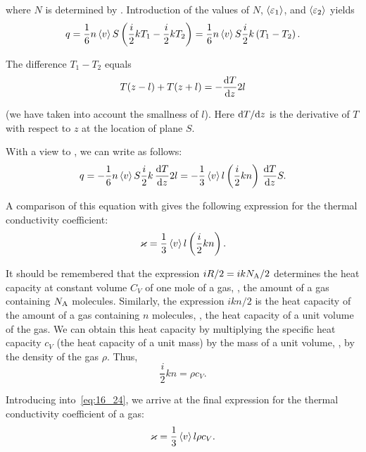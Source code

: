 \noindent
where $N$ is determined by . Introduction of the values of $N$, $\left\langle \varepsilon_1 \right\rangle$, and $\left\langle \varepsilon_2 \right\rangle$ yields
\begin{equation}\label{eq:16_21}
    q = \frac{1}{6} n\left\langle v \right\rangle S \left(\frac{i}{2}kT_1 - \frac{i}{2}kT_2\right) = \frac{1}{6} n\left\langle v \right\rangle S \frac{i}{2} k\left(T_1-T_2\right).
\end{equation}

\noindent
The difference $T_1-T_2$ equals
\begin{equation}\label{eq:16_22}
    T (z-l) + T (z+l) = -\frac{\mathrm{d} T}{\mathrm{d} z} 2l
\end{equation}

\noindent
(we have taken into account the smallness of $l$). Here $\mathrm{d} T/\mathrm{d} z$ is the derivative of $T$ with respect to $z$ at the location of plane $S$.

With a view to , we can write  as follows:
\begin{equation}\label{eq:16_23}
    q = -\frac{1}{6} n\left\langle v \right\rangle S \frac{i}{2}k\,\frac{\mathrm{d} T}{\mathrm{d} z} 2l = -\frac{1}{3} \left\langle v \right\rangle l \left(\frac{i}{2}kn\right)\,\frac{\mathrm{d} T}{\mathrm{d} z} S.
\end{equation}

\noindent
A comparison of this equation with  gives the following expression for the thermal conductivity coefficient:
\begin{equation}\label{eq:16_24}
    \varkappa = \frac{1}{3} \left\langle v \right\rangle l \left(\frac{i}{2}kn\right).
\end{equation}

It should be remembered that the expression $iR/2=ikN_{\text{A}}/2$ determines the heat capacity at constant volume $C_V$ of one mole of a gas, \ie, the amount of a gas containing $N_{\text{A}}$ molecules. Similarly, the expression $ikn/2$ is the heat capacity of the amount of a gas containing $n$ molecules, \ie, the heat capacity of a unit volume of the gas. We can obtain this heat capacity by multiplying the specific
heat capacity $c_V$ (the heat capacity of a unit mass) by the mass of a unit volume, \ie, by the density of the gas $\rho$. Thus,
\begin{equation}\label{eq:16_25}
    \frac{i}{2}kn = \rho c_V.
\end{equation}

Introducing  into~\eqref{eq:16_24}, we arrive at the final expression for the thermal conductivity coefficient of a gas:
\begin{equation}\label{eq:16_26}
    \varkappa = \frac{1}{3} \left\langle v \right\rangle l \rho c_V.
\end{equation}

